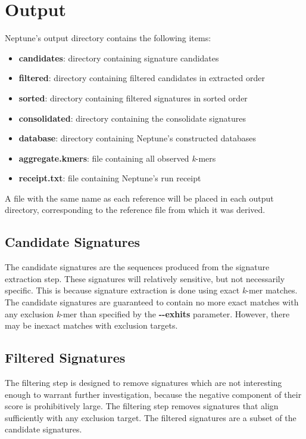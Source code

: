\documentclass[a4paper,10pt]{article}
\begin{document}
\newpage
\section{Output}

Neptune's output directory contains the following items:

\begin{itemize}
  \item \textbf{candidates}: directory containing signature candidates
  \item \textbf{filtered}: directory containing filtered candidates in extracted order
  \item \textbf{sorted}: directory containing filtered signatures in sorted order
  \item \textbf{consolidated}: directory containing the consolidate signatures
  \item \textbf{database}: directory containing Neptune's constructed databases
  \item \textbf{aggregate.kmers}: file containing all observed \textit{k}-mers
  \item \textbf{receipt.txt}: file containing Neptune's run receipt
\end{itemize}

A file with the same name as each reference will be placed in each output directory, corresponding to the reference file from which it was derived.

\subsection{Candidate Signatures}

The candidate signatures are the sequences produced from the signature extraction step. These signatures will relatively sensitive, but not necessarily specific. This is because signature extraction is done using exact \textit{k}-mer matches. The candidate signatures are guaranteed to contain no more exact matches with any exclusion \textit{k}-mer than specified by the \mbox{\textbf{-{}-exhits}} parameter. However, there may be inexact matches with exclusion targets.

\subsection{Filtered Signatures}

The filtering step is designed to remove signatures which are not interesting enough to warrant further investigation, because the negative component of their score is prohibitively large. The filtering step removes signatures that align sufficiently with any exclusion target. The filtered signatures are a subset of the candidate signatures.
\end{document}
